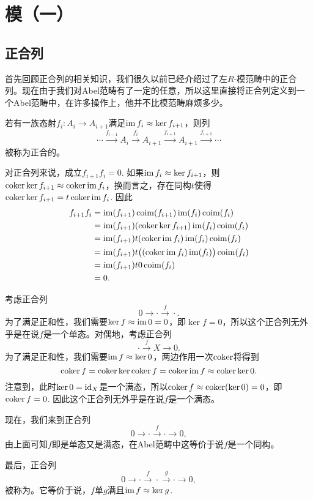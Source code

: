 \chapter{模（一）}

\section{正合列}

首先回顾正合列的相关知识，我们很久以前已经介绍过了左$R$-模范畴中的正合列。现在由于我们对Abel范畴有了一定的任意，所以这里直接将正合列定义到一个Abel范畴中，在许多操作上，他并不比模范畴麻烦多少。

\begin{para}
若有一族态射$f_i:A_i\to A_{i+1}$满足$\operatorname{im} f_i\approx \ker f_{i+1}$，则列
\[
	\cdots \xrightarrow{f_{i-1}}A_i \xrightarrow{f_i} A_{i+1} \xrightarrow{f_{i+1}} A_{i+1}\xrightarrow{f_{i+1}}\cdots
\]
被称为正合的。
\end{para}

对正合列来说，成立$f_{i+1}f_i=0$. 如果$\operatorname{im} f_i\approx \ker f_{i+1}$，则$\operatorname{coker} \ker f_{i+1} \approx \operatorname{coker} \operatorname{im} f_i$，换而言之，存在同构$t$使得$\operatorname{coker} \ker f_{i+1}=t\operatorname{coker} \operatorname{im} f_i$. 因此
\begin{align*}
f_{i+1}f_i&=\operatorname{im}(f_{i+1})\operatorname{coim}(f_{i+1})\operatorname{im}(f_{i})\operatorname{coim}(f_{i})\\
	&=\operatorname{im}(f_{i+1})(\operatorname{coker} \ker f_{i+1}) \operatorname{im}(f_{i})\operatorname{coim}(f_{i})\\
	&=\operatorname{im}(f_{i+1})t(\operatorname{coker} \operatorname{im} f_i) \operatorname{im}(f_{i})\operatorname{coim}(f_{i})\\
	&=\operatorname{im}(f_{i+1})t\bigl((\operatorname{coker} \operatorname{im} f_i) \operatorname{im}(f_{i})\bigr)\operatorname{coim}(f_{i})\\
	&=\operatorname{im}(f_{i+1})t0\operatorname{coim}(f_{i})\\
	&=0.
\end{align*}

\begin{para}[短正合列]
考虑正合列
\[
	0\to \cdot \xrightarrow{f} \cdot.
\]
为了满足正和性，我们需要$\ker f \approx \operatorname{im} 0=0$，即$\ker f = 0$，所以这个正合列无外乎是在说$f$是一个单态。对偶地，考虑正合列
\[
	\cdot\xrightarrow{f} X \to  0.
\]
为了满足正和性，我们需要$\operatorname{im} f \approx \ker 0$，两边作用一次$\operatorname{coker}$将得到
\[
	\operatorname{coker} f=\operatorname{coker} \ker \operatorname{coker} f=\operatorname{coker} \operatorname{im} f \approx \operatorname{coker} \ker 0.
\]
注意到，此时$\ker 0=\operatorname{id}_X$是一个满态，所以$\operatorname{coker} f \approx \operatorname{coker}(\ker 0)=0$，即$\operatorname{coker} f = 0$. 因此这个正合列无外乎是在说$f$是一个满态。

现在，我们来到正合列
\[
	0\to \cdot \xrightarrow{f} \cdot \to 0,
\]
由上面可知$f$即是单态又是满态，在Abel范畴中这等价于说$f$是一个同构。

最后，正合列
\[
	0\to \cdot \xrightarrow{f} \cdot \xrightarrow{g}\cdot\to 0,
\]
被称为。它等价于说，$f$单$g$满且$\operatorname{im} f\approx \ker g$.
\end{para}

